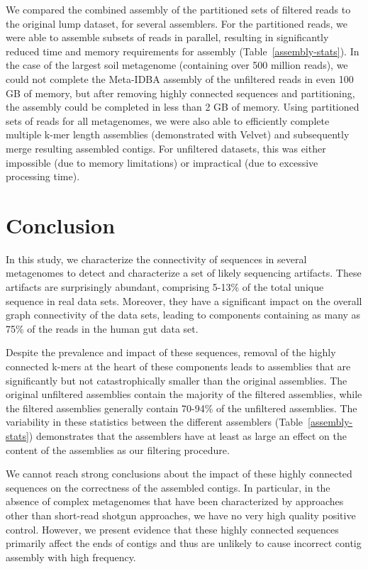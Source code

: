 \documentclass[10pt]{article}
\begin{document}
We compared the combined assembly of the partitioned sets of filtered
reads to the original lump dataset, for several assemblers.  For the
partitioned reads, we were able to assemble subsets of reads in
parallel, resulting in significantly reduced time and memory
requirements for assembly (Table~\ref{assembly-stats}).  In the case of the largest soil
metagenome (containing over 500 million reads), we could not complete
the Meta-IDBA assembly of the unfiltered reads in even 100 GB of
memory, but after removing highly connected sequences and
partitioning, the assembly could be completed in less than 2 GB of
memory.  Using partitioned sets of reads for all metagenomes, we were
also able to efficiently complete multiple k-mer length assemblies
(demonstrated with Velvet) and subsequently merge resulting assembled
contigs.  For unfiltered datasets, this was either impossible (due to
memory limitations) or impractical (due to excessive processing time).


\section*{Conclusion}

In this study, we characterize the connectivity of sequences in
several metagenomes to detect and characterize a set of likely
sequencing artifacts.  These artifacts are surprisingly abundant,
comprising 5-13\% of the total unique sequence in real data sets.
Moreover, they have a significant impact on the overall graph
connectivity of the data sets, leading to components containing as
many as 75\% of the reads in the human gut data set.

Despite the prevalence and impact of these sequences, removal of the
highly connected k-mers at the heart of these components leads to
assemblies that are significantly but not catastrophically smaller
than the original assemblies.  The original unfiltered assemblies
contain the majority of the filtered assemblies, while the filtered
assemblies generally contain 70-94\% of the unfiltered assemblies.
The variability in these statistics between the different assemblers
(Table~\ref{assembly-stats}) demonstrates that the assemblers have at least as large an
effect on the content of the assemblies as our filtering procedure.

We cannot reach strong conclusions about the impact of these highly
connected sequences on the correctness of the assembled contigs.  In
particular, in the absence of complex metagenomes that have been
characterized by approaches other than short-read shotgun approaches,
we have no very high quality positive control.  However, we present
evidence that these highly connected sequences primarily affect the
ends of contigs and thus are unlikely to cause incorrect contig
assembly with high frequency.
\end{document}
